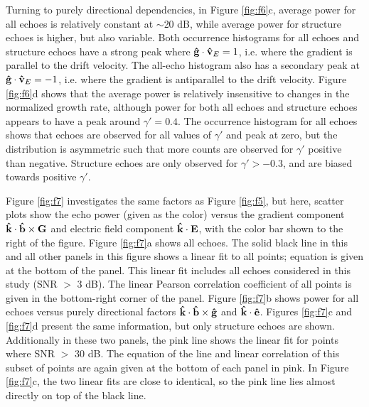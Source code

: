 Turning to purely directional dependencies, in Figure \ref{fig:f6}c, average power for all echoes is relatively constant at \(\sim\)20 dB, while average power for structure echoes is higher, but also variable.  Both occurrence histograms for all echoes and structure echoes have a strong peak where \(\mathbf{\hat{g}}\cdot\mathbf{\hat{v}}_E = 1\), i.e. where the gradient is parallel to the drift velocity. The all-echo histogram also has a secondary peak at \(\mathbf{\hat{g}}\cdot\mathbf{\hat{v}}_E = -1\), i.e. where the gradient is antiparallel to the drift velocity.  Figure \ref{fig:f6}d shows that the average power is relatively insensitive to changes in the normalized growth rate, although power for both all echoes and structure echoes appears to have a peak around \(\gamma'=0.4\).  The occurrence histogram for all echoes shows that echoes are observed for all values of \(\gamma'\) and peak at zero, but the distribution is asymmetric such that more counts are observed for \(\gamma'\) positive than negative.  Structure echoes are only observed for \(\gamma'>-0.3\), and are biased towards positive \(\gamma'\).

Figure \ref{fig:f7} investigates the same factors as Figure \ref{fig:f5}, but here, scatter plots show the echo power (given as the color) versus the gradient component \(\mathbf{\hat{k}}\cdot\mathbf{\hat{b}}\times\mathbf{G}\) and electric field component \(\mathbf{\hat{k}}\cdot\mathbf{E}\), with the color bar shown to the right of the figure.  Figure \ref{fig:f7}a shows all echoes.  The solid black line in this and all other panels in this figure shows a linear fit to all points; equation is given at the bottom of the panel.  This linear fit includes all echoes considered in this study (SNR $>$ 3 dB).  The linear Pearson correlation coefficient of all points is given in the bottom-right corner of the panel.  Figure \ref{fig:f7}b shows power for all echoes versus purely directional factors \(\mathbf{\hat{k}}\cdot\mathbf{\hat{b}}\times\mathbf{\hat{g}}\) and \(\mathbf{\hat{k}}\cdot\mathbf{\hat{e}}\).  Figures \ref{fig:f7}c and \ref{fig:f7}d present the same information, but only structure echoes are shown.  Additionally in these two panels, the pink line shows the linear fit for points where SNR \(>\) 30 dB.  The equation of the line and linear correlation of this subset of points are again given at the bottom of each panel in pink.  In Figure \ref{fig:f7}c, the two linear fits are close to identical, so the pink line lies almost directly on top of the black line.

